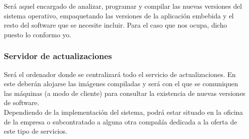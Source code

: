 Será aquel encargado de analizar, programar y compilar las nuevas versiones del sistema operativo, empaquetando las versiones de la aplicación embebida y el resto del software que se necesite incluir. Para el caso que nos ocupa, dicho puesto lo conformo yo.

\subsubsection{Servidor de actualizaciones}
	
Será el ordenador donde se centralizará todo el servicio de actualizaciones. En este deberán alojarse las imágenes compiladas y será con el que se comuniquen las máquinas (a modo de cliente) para consultar la existencia de nuevas versiones de software.\\

Dependiendo de la implementación del sistema, podrá estar situado en la oficina de la empresa o subcontratado a alguna otra compañía dedicada a la oferta de este tipo de servicios.
	
\newpage
